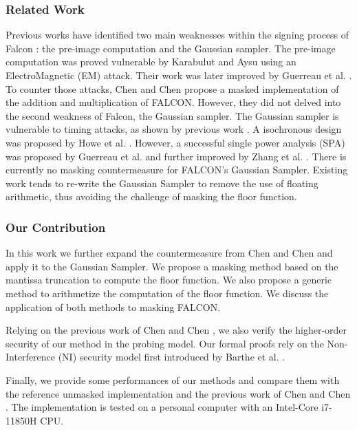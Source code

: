 \documentclass[runningheads]{llncs}
\begin{document}
\subsubsection{Related Work} Previous works have identified two main weaknesses within the signing process of Falcon : the pre-image computation and the Gaussian sampler. The pre-image computation was proved vulnerable by Karabulut and Aysu \cite{9586131} using an ElectroMagnetic (EM) attack. Their work was later improved by Guerreau et al. \cite{Guerreau_Martinelli_Ricosset_Rossi_2022}. To counter those attacks, Chen and Chen \cite{Chen_Chen_2024} propose a masked implementation of the addition and multiplication of FALCON. However, they did not delved into the second weakness of Falcon, the Gaussian sampler.\newline
The Gaussian sampler is vulnerable to timing attacks, as shown by previous work \cite{10.1007/978-3-662-53140-2_16,10.1145/3133956.3134028,cryptoeprint:2019/478,10.1145/3133956.3134023}. A isochronous design was proposed by Howe et al. \cite{10.1007/978-3-030-44223-1_4}. However, a successful single power analysis (SPA) was proposed by Guerreau et al. \cite{Guerreau_Martinelli_Ricosset_Rossi_2022} and further improved by Zhang et al. \cite{10.1007/978-3-031-30634-1_19}. There is currently no masking countermeasure for FALCON's Gaussian Sampler. Existing work \cite{10.1007/978-3-031-07082-2_9} tends to re-write the Gaussian Sampler to remove the use of floating arithmetic, thus avoiding the challenge of masking the floor function. 
%
\subsubsection{Our Contribution}
In this work we further expand the countermeasure from Chen and Chen \cite{Chen_Chen_2024} and apply it to the Gaussian Sampler. We propose a masking method based on the mantissa truncation to compute the floor function. We also propose a generic method to arithmetize the computation of the floor function. We discuss the application of both methods to masking FALCON.

\medskip

Relying on the previous work of Chen and Chen \cite{Chen_Chen_2024}, we also verify the higher-order security of our method in the probing model. Our formal proofs rely on the Non-Interference (NI) security model first introduced by Barthe et al. \cite{barthe2016strong}.

\medskip

Finally, we provide some performances of our methods and compare them with the reference unmasked implementation and the previous work of Chen and Chen \cite{Chen_Chen_2024}. The implementation is tested on a personal computer with an Intel-Core i7-11850H CPU.
%
\end{document}
